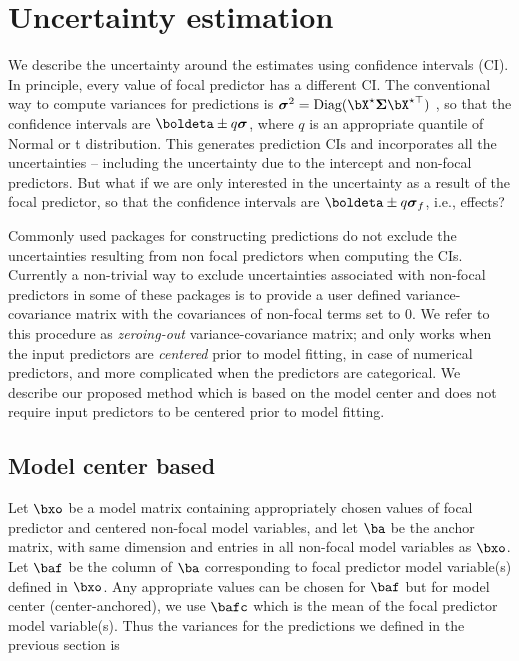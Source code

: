 \section{Uncertainty estimation}

We describe the uncertainty around the estimates using confidence intervals (CI). In principle, every value of focal predictor has a different CI. The conventional way to compute variances for predictions is $\boldsymbol\sigma^2 = \textrm{Diag}(\bX^\star \boldsymbol{\Sigma} \bX^{\star\top})$ \citep{lenth2018package, fox2009effect}, so that the confidence intervals are $\boldeta \pm q\boldsymbol\sigma$, where $q$ is an appropriate quantile of Normal or t distribution. This generates prediction CIs and incorporates all the uncertainties -- including the uncertainty due to the intercept and non-focal predictors.  But what if we are only interested in the uncertainty as a result of the focal predictor, so that the confidence intervals are $\boldeta \pm q \boldsymbol \sigma_f$, i.e., effects? 

Commonly used  packages for constructing predictions do not exclude the uncertainties resulting from non focal predictors when computing the CIs. Currently a non-trivial way to exclude uncertainties associated with non-focal predictors in some of these packages is to provide a user defined variance-covariance matrix with the covariances of non-focal terms set to $0$. We refer to this procedure as \emph{zeroing-out} variance-covariance matrix; and only works when the input predictors are \emph{centered} prior to model fitting, in case of numerical predictors, and more complicated when the predictors are categorical. We describe our proposed method which is based on the model center and does not require input predictors to be centered prior to model fitting.


\subsection{Model center based}

Let $\bxo$ be a model matrix containing appropriately chosen values of focal predictor and centered non-focal model variables, and let $\ba$ be the anchor matrix, with same dimension and entries in all non-focal model variables as $\bxo$. Let $\baf$ be the column of $\ba$ corresponding to focal predictor model variable(s) defined in $\bxo$. Any appropriate values can be chosen for $\baf$ but for model center (center-anchored), we use $\bafc$ which is the mean of the focal predictor model variable(s). Thus the variances for the predictions we defined in the previous section is 

